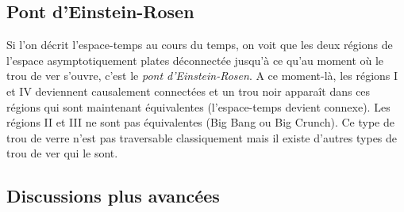 \documentclass[a4paper,11pt]{report}
\begin{document}
        \subsection{Pont d'Einstein-Rosen}
        
            Si l'on décrit l'espace-temps au cours du temps, on voit que les deux régions de l'espace asymptotiquement plates déconnectée jusqu'à ce qu'au moment où le trou de ver s'ouvre, c'est le \textit{pont d'Einstein-Rosen}. A ce moment-là, les régions I et IV deviennent causalement connectées et un trou noir apparaît dans ces régions qui sont maintenant équivalentes (l'espace-temps devient connexe). Les régions II et III ne sont pas équivalentes (Big Bang ou Big Crunch). Ce type de trou de verre n'est pas traversable classiquement mais il existe d'autres types de trou de ver qui le sont.
        
        \subsection{Discussions plus avancées}
        
            
            
            
\end{document}
